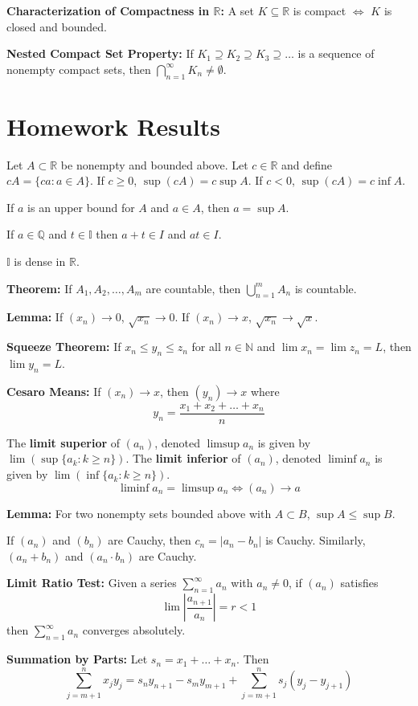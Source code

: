 \documentclass[12pt]{article}
\newcommand{\R}{\mathbb{R}}
\newcommand{\N}{\mathbb{N}}
\newcommand{\Q}{\mathbb{Q}}
\newcommand{\I}{\mathbb{I}}
\newcommand{\abs}[1]{\left\vert #1 \right\vert}
\begin{document}
\textbf{Characterization of Compactness in $\R$:} A set $K \subseteq \R$ is compact $\iff$ $K$ is closed and bounded.

\textbf{Nested Compact Set Property:} If $K_1 \supseteq K_2 \supseteq K_3 \supseteq \dots$ is a sequence of nonempty compact sets, then $\bigcap_{n=1}^\infty K_n \neq \emptyset$.

\section{Homework Results} 

Let $A \subset \R$ be nonempty and bounded above. Let $c \in \R$ and define $cA = \{ca: a \in A\}$. If $c \geq 0$, $\sup(cA) = c\sup A$. If $c < 0$, $\sup(cA) = c\inf A$.

If $a$ is an upper bound for $A$ and $a \in A$, then $a = \sup A$. 

If $a \in \Q$ and $t \in \I$ then $a + t \in I$ and $at \in I$. 

$\I$ is dense in $\R$. 

\textbf{Theorem:} If $A_1, A_2, \dots, A_m$ are countable, then $\bigcup_{n=1}^m A_n$ is countable.

\textbf{Lemma:} If $(x_n) \to 0$, $\sqrt{x_n} \to 0$. If $(x_n) \to x$, $\sqrt{x_n} \to \sqrt{x}$. 

\textbf{Squeeze Theorem:} If $x_n \leq y_n \leq z_n$ for all $n \in \N$ and $\lim x_n = \lim z_n = L$, then $\lim y_n = L$. 

\textbf{Cesaro Means:} If $(x_n) \to x$, then $(y_n) \to x$ where 
\[y_n = \frac{x_1 + x_2 + \dots + x_n}{n}\]

The \textbf{limit superior} of $(a_n)$, denoted $\limsup a_n$ is given by $\lim \left(\sup\{a_k: k \geq n\}\right)$. The \textbf{limit inferior} of $(a_n)$, denoted $\liminf a_n$ is given by $\lim \left(\inf\{a_k: k \geq n\}\right)$. 
\[\liminf a_n = \limsup a_n \iff (a_n) \to a\]

\textbf{Lemma:} For two nonempty sets bounded above with $A \subset B$, $\sup A \leq \sup B$. 

If $(a_n)$ and $(b_n)$ are Cauchy, then $c_n = \abs{a_n - b_n}$ is Cauchy. Similarly, $(a_n + b_n)$ and $(a_n \cdot b_n)$ are Cauchy. 

\textbf{Limit Ratio Test:} Given a series $\sum_{n=1}^{\infty} a_n$ with $a_n \neq 0$, if $(a_n)$ satisfies 
\[\lim \abs{\frac{a_{n+1}}{a_n}} = r < 1\]
then $\sum_{n=1}^{\infty} a_n$ converges absolutely. 

\textbf{Summation by Parts:} Let $s_n = x_1 + \dots + x_n$. Then 
\[\sum_{j=m+1}^n x_jy_j = s_n y_{n+1} - s_m y_{m+1} + \sum_{j=m+1}^n s_j(y_j - y_{j+1})\]
\end{document}
